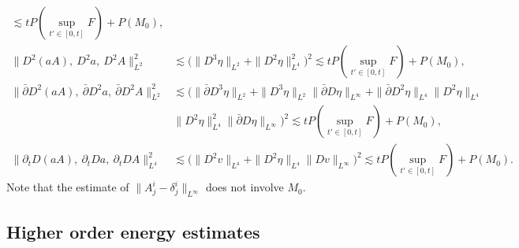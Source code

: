 \documentclass[12pt,a4paper]{amsart}
\numberwithin{equation}{section}
\theoremstyle{plain}
\theoremstyle{definition}
\newcommand{\bpartial}{\bar{\partial}}
\begin{document}
\begin{align*}
\lesssim t P(\sup\limits_{t'\in[0,t]}F)+P(M_0),\\
\|D^2(aA),\ D^2a,\ D^2A\|_{L^2}^2
&\lesssim \Big(\|D^3\eta\|_{L^2}+\|D^2\eta\|_{L^4}^2 \Big)^2
\lesssim t P(\sup\limits_{t'\in[0,t]}F)+P(M_0),\\
\|\bpartial D^2(aA),\ \bpartial D^2a,\ \bpartial D^2A\|_{L^2}^2
&\lesssim \Big(\|\bpartial D^3\eta\|_{L^2}+\|D^3\eta\|_{L^2}\|\bpartial D\eta\|_{L^{\infty}}+\|\bpartial D^2 \eta\|_{L^4}\|D^2\eta\|_{L^4}\\
&\|D^2\eta\|_{L^4}^2\|\bpartial D\eta\|_{L^{\infty}} \Big)^2
\lesssim t P(\sup\limits_{t'\in[0,t]}F)+P(M_0),\\
\|\partial_t D(aA),\ \partial_t Da,\ \partial_t DA\|_{L^4}^2
&\lesssim \Big( \| D^2 v\|_{L^4}+\|D^2\eta\|_{L^4}\|Dv\|_{L^{\infty}}\Big)^2
\lesssim t P(\sup\limits_{t'\in[0,t]}F)+P(M_0).
\end{align*}
Note that the estimate of $\|A^i_j-\delta^i_j\|_{L^{\infty}}$ does not involve $M_0$.
\vspace{0.5cm}

\subsection{Higher order energy estimates}~
\end{document}
